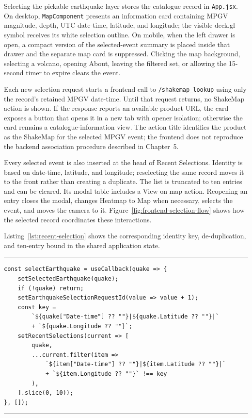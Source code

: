 \documentclass[12pt]{article}
\begin{document}
Selecting the pickable earthquake layer stores the catalogue record in \texttt{App.jsx}. On desktop, \texttt{MapComponent} presents an information card containing MPGV magnitude, depth, UTC date-time, latitude, and longitude; the visible deck.gl symbol receives its white selection outline. On mobile, when the left drawer is open, a compact version of the selected-event summary is placed inside that drawer and the separate map card is suppressed. Clicking the map background, selecting a volcano, opening About, leaving the filtered set, or allowing the 15-second timer to expire clears the event.

Each new selection request starts a frontend call to \texttt{/shakemap\_lookup} using only the record's retained MPGV date-time. Until that request returns, no ShakeMap action is shown. If the response reports an available product URL, the card exposes a button that opens it in a new tab with opener isolation; otherwise the card remains a catalogue-information view. The action title identifies the product as the ShakeMap for the selected MPGV event; the frontend does not reproduce the backend association procedure described in Chapter~5.

Every selected event is also inserted at the head of Recent Selections. Identity is based on date-time, latitude, and longitude; reselecting the same record moves it to the front rather than creating a duplicate. The list is truncated to ten entries and can be cleared. Its modal table includes a View on map action. Reopening an entry closes the modal, changes Heatmap to Map when necessary, selects the event, and moves the camera to it. Figure~\ref{fig:frontend-selection-flow} shows how the selected record coordinates these interactions.

Listing~\ref{lst:recent-selection} shows the corresponding identity key, de-duplication, and ten-entry bound in the shared application state.

\begin{codelisting}[H]
\centering
\begin{minipage}{0.96\linewidth}
\hrule
\footnotesize
\begin{verbatim}
const selectEarthquake = useCallback(quake => {
    setSelectedEarthquake(quake);
    if (!quake) return;
    setEarthquakeSelectionRequestId(value => value + 1);
    const key =
        `${quake["Date-time"] ?? ""}|${quake.Latitude ?? ""}|`
        + `${quake.Longitude ?? ""}`;
    setRecentSelections(current => [
        quake,
        ...current.filter(item =>
            `${item["Date-time"] ?? ""}|${item.Latitude ?? ""}|`
            + `${item.Longitude ?? ""}` !== key
        ),
    ].slice(0, 10));
}, []);
\end{verbatim}
\hrule
\end{minipage}
\caption{Selected-event state and bounded Recent Selections history in \texttt{App.jsx}.}
\label{lst:recent-selection}
\end{codelisting}
\end{document}
